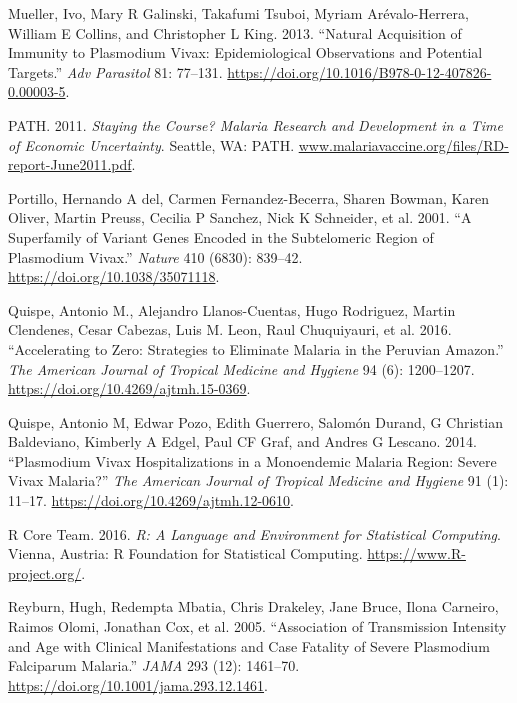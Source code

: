 \documentclass[
  a4paper]{article}
\begin{document}
\leavevmode\hypertarget{ref-mueller2013}{}%
Mueller, Ivo, Mary R Galinski, Takafumi Tsuboi, Myriam Arévalo-Herrera,
William E Collins, and Christopher L King. 2013. ``Natural Acquisition
of Immunity to Plasmodium Vivax: Epidemiological Observations and
Potential Targets.'' \emph{Adv Parasitol} 81: 77--131.
\url{https://doi.org/10.1016/B978-0-12-407826-0.00003-5}.

\leavevmode\hypertarget{ref-path2011}{}%
PATH. 2011. \emph{Staying the Course? Malaria Research and Development
in a Time of Economic Uncertainty}. Seattle, WA: PATH.
\url{www.malariavaccine.org/files/RD-report-June2011.pdf}.

\leavevmode\hypertarget{ref-portillo2001vir}{}%
Portillo, Hernando A del, Carmen Fernandez-Becerra, Sharen Bowman, Karen
Oliver, Martin Preuss, Cecilia P Sanchez, Nick K Schneider, et al. 2001.
``A Superfamily of Variant Genes Encoded in the Subtelomeric Region of
Plasmodium Vivax.'' \emph{Nature} 410 (6830): 839--42.
\url{https://doi.org/10.1038/35071118}.

\leavevmode\hypertarget{ref-accelerate2016}{}%
Quispe, Antonio M., Alejandro Llanos-Cuentas, Hugo Rodriguez, Martin
Clendenes, Cesar Cabezas, Luis M. Leon, Raul Chuquiyauri, et al. 2016.
``Accelerating to Zero: Strategies to Eliminate Malaria in the Peruvian
Amazon.'' \emph{The American Journal of Tropical Medicine and Hygiene}
94 (6): 1200--1207. \url{https://doi.org/10.4269/ajtmh.15-0369}.

\leavevmode\hypertarget{ref-quispe2014}{}%
Quispe, Antonio M, Edwar Pozo, Edith Guerrero, Salomón Durand, G
Christian Baldeviano, Kimberly A Edgel, Paul CF Graf, and Andres G
Lescano. 2014. ``Plasmodium Vivax Hospitalizations in a Monoendemic
Malaria Region: Severe Vivax Malaria?'' \emph{The American Journal of
Tropical Medicine and Hygiene} 91 (1): 11--17.
\url{https://doi.org/10.4269/ajtmh.12-0610}.

\leavevmode\hypertarget{ref-R2016}{}%
R Core Team. 2016. \emph{R: A Language and Environment for Statistical
Computing}. Vienna, Austria: R Foundation for Statistical Computing.
\url{https://www.R-project.org/}.

\leavevmode\hypertarget{ref-reyburn2015}{}%
Reyburn, Hugh, Redempta Mbatia, Chris Drakeley, Jane Bruce, Ilona
Carneiro, Raimos Olomi, Jonathan Cox, et al. 2005. ``Association of
Transmission Intensity and Age with Clinical Manifestations and Case
Fatality of Severe Plasmodium Falciparum Malaria.'' \emph{JAMA} 293
(12): 1461--70. \url{https://doi.org/10.1001/jama.293.12.1461}.
\end{document}
